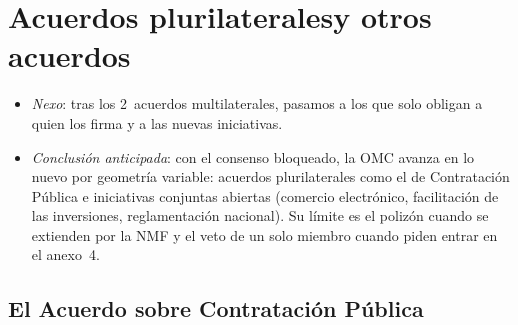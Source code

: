 \documentclass[11pt]{article}
\begin{document}
\section{Acuerdos plurilaterales\cortetitulo y otros acuerdos}\label{sec:plurilaterales}

\begin{itemize}
\item \emph{Nexo}: tras los 2~acuerdos multilaterales, pasamos a los que solo obligan a quien los firma y a las nuevas iniciativas.
\item \emph{Conclusión anticipada}: con el consenso bloqueado, la OMC avanza en lo nuevo por geometría variable: acuerdos plurilaterales como el de Contratación Pública e iniciativas conjuntas abiertas (comercio electrónico, facilitación de las inversiones, reglamentación nacional). Su límite es el polizón cuando se extienden por la NMF y el veto de un solo miembro cuando piden entrar en el anexo~4.
\end{itemize}

\subsection{El Acuerdo sobre Contratación Pública}\label{sec:acp}
\end{document}
